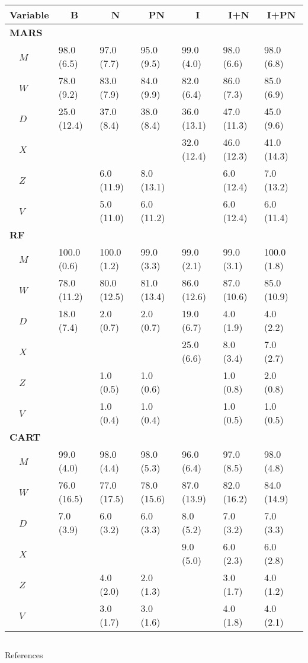 \documentclass{beamer}
\begin{document}
\begin{frame}[c]{}
  \begin{columns}
    \column{\dimexpr\paperwidth}
\begin{table}
\scriptsize
\centering
\begin{tabular}{lllllll}
\toprule
\multicolumn{1}{l}{Variable}&\multicolumn{1}{c}{B}&\multicolumn{1}{c}{N}&\multicolumn{1}{c}{PN}&\multicolumn{1}{c}{I}&\multicolumn{1}{c}{I+N}&\multicolumn{1}{c}{I+PN}\tabularnewline
\midrule
{\bfseries MARS}&&&&&&\tabularnewline
~~$M$&98.0 (6.5)&97.0 (7.7)&95.0 (9.5)&99.0 (4.0)&98.0 (6.6)&98.0 (6.8)\tabularnewline
~~$W$&78.0 (9.2)&83.0 (7.9)&84.0 (9.9)&82.0 (6.4)&86.0 (7.3)&85.0 (6.9)\tabularnewline
~~$D$&25.0 (12.4)&37.0 (8.4)&38.0 (8.4)&36.0 (13.1)&47.0 (11.3)&45.0 (9.6)\tabularnewline
~~$X$&&&&32.0 (12.4)&46.0 (12.3)&41.0 (14.3)\tabularnewline
~~$Z$&&6.0 (11.9)&8.0 (13.1)&&6.0 (12.4)&7.0 (13.2)\tabularnewline
~~$V$&&5.0 (11.0)&6.0 (11.2)&&6.0 (12.4)&6.0 (11.4)\tabularnewline
\midrule
{\bfseries RF}&&&&&&\tabularnewline
~~$M$&100.0 (0.6)&100.0 (1.2)&99.0 (3.3)&99.0 (2.1)&99.0 (3.1)&100.0 (1.8)\tabularnewline
~~$W$&78.0 (11.2)&80.0 (12.5)&81.0 (13.4)&86.0 (12.6)&87.0 (10.6)&85.0 (10.9)\tabularnewline
~~$D$&18.0 (7.4)&2.0 (0.7)&2.0 (0.7)&19.0 (6.7)&4.0 (1.9)&4.0 (2.2)\tabularnewline
~~$X$&&&&25.0 (6.6)&8.0 (3.4)&7.0 (2.7)\tabularnewline
~~$Z$&&1.0 (0.5)&1.0 (0.6)&&1.0 (0.8)&2.0 (0.8)\tabularnewline
~~$V$&&1.0 (0.4)&1.0 (0.4)&&1.0 (0.5)&1.0 (0.5)\tabularnewline
\midrule
{\bfseries CART}&&&&&&\tabularnewline
~~$M$&99.0 (4.0)&98.0 (4.4)&98.0 (5.3)&96.0 (6.4)&97.0 (8.5)&98.0 (4.8)\tabularnewline
~~$W$&76.0 (16.5)&77.0 (17.5)&78.0 (15.6)&87.0 (13.9)&82.0 (16.2)&84.0 (14.9)\tabularnewline
~~$D$&7.0 (3.9)&6.0 (3.2)&6.0 (3.3)&8.0 (5.2)&7.0 (3.2)&7.0 (3.3)\tabularnewline
~~$X$&&&&9.0 (5.0)&6.0 (2.3)&6.0 (2.8)\tabularnewline
~~$Z$&&4.0 (2.0)&2.0 (1.3)&&3.0 (1.7)&4.0 (1.2)\tabularnewline
~~$V$&&3.0 (1.7)&3.0 (1.6)&&4.0 (1.8)&4.0 (2.1)\tabularnewline
\bottomrule
\end{tabular}
\end{table}
  \end{columns}
\end{frame}



\begin{frame}[allowframebreaks]{References}

\printbibliography[heading=none]

\end{frame}
\end{document}
